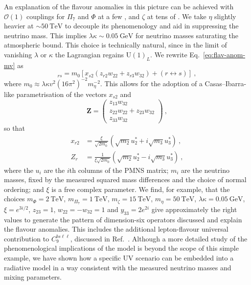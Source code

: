   An explanation of the flavour anomalies in this picture can be achieved with
  $\mathcal{O}(1)$ couplings for $\Pi_{7}$ and $\Phi$ at a few \TeV, and $\zeta$
  at tens of \TeV. We take $\eta$ slightly heavier at $\sim \SI{50}{\TeV}$ to
  decouple its phenomenology and aid in suppressing the neutrino mass. This
  implies $\lambda \kappa \sim \SI{0.05}{\GeV}$ for neutrino masses saturating
  the atmospheric bound. This choice is technically natural, since in the limit
  of vanishing $\lambda$ or $\kappa$ the Lagrangian regains $\mathrm{U}(1)_{L}$.
  We rewrite Eq.~\eqref{eq:flav-anom-mv} as
  \begin{equation}
    [\mathbf{m}_{\nu}]_{rs} = m_{0} [ x_{s2}(z_{r2}w_{22} + z_{r3}w_{32}) + (r \leftrightarrow s) ] \ ,
  \end{equation}
  where $m_{0} \approx \lambda \kappa v^{2} (16\pi^{2})^{-2} m_{\eta}^{-2}$.
  This allows for the adoption of a Casas--Ibarra-like parametrisation of the
  vectors $x_{s2}$ and
  \begin{equation}
    \mathbf{Z} = \begin{pmatrix} z_{13}w_{32} \\ z_{22}w_{22} + z_{23}w_{32} \\ z_{33} w_{32} \end{pmatrix} \ ,
  \end{equation}
  so that~\cite{Cai:2014kra}
  \begin{align}
    x_{r2} &= \frac{\xi}{\sqrt{2m_{0}}} \left(\sqrt{m_{2}} u_{2}^{*} + i \sqrt{m_{3}} u_{3}^{*} \right) \ , \\
    Z_{r} &= \frac{1}{\xi \sqrt{2m_{0}}} \left(\sqrt{m_{2}} u_{2}^{*} - i \sqrt{m_{3}} u_{3}^{*} \right) \ ,
  \end{align}
  where the $u_{i}$ are the $i$th columns of the PMNS matrix; $m_{i}$ are the
  neutrino masses, fixed by the measured squared mass differences and the choice
  of normal ordering; and $\xi$ is a free complex parameter. We find, for
  example, that the choices $m_{\Phi} = \SI{2}{\TeV}$,
  $m_{\Pi_{7}} = \SI{1}{\TeV}$, $m_{\zeta} = \SI{15}{\TeV}$,
  $m_{\eta} = \SI{50}{\TeV}$, $\lambda \kappa = \SI{0.05}{\GeV}$,
  $\xi = e^{3i/2}$, $z_{23} = 1$, $w_{22} = - w_{32} = 1$ and $y_{33} = 2e^{2i}$
  give approximately the right values to generate the pattern of dimension-six
  operators discussed and explain the flavour anomalies. This includes the
  additional lepton-flavour universal contribution to $C_{9}^{bs\ell\ell}$,
  discussed in Ref.~\cite{Aebischer:2019mlg}. Although a more detailed study of
  the phenomenological implications of the model is beyond the scope of this
  simple example, we have shown how a specific UV scenario can be embedded into
  a radiative model in a way consistent with the measured neutrino masses and
  mixing parameters.

